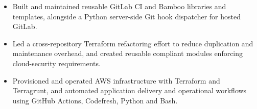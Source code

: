 \begin{itemize}
  \item Built and maintained reusable GitLab CI and Bamboo libraries and templates, alongside a Python server-side Git hook dispatcher for hosted GitLab.
  \item Led a cross-repository Terraform refactoring effort to reduce duplication and maintenance overhead, and created reusable compliant modules enforcing cloud-security requirements.
\end{itemize}

\companygap
{}
\begin{itemize}
  \item Provisioned and operated AWS infrastructure with Terraform and Terragrunt, and automated application delivery and operational workflows using GitHub Actions, Codefresh, Python and Bash.
\end{itemize}
